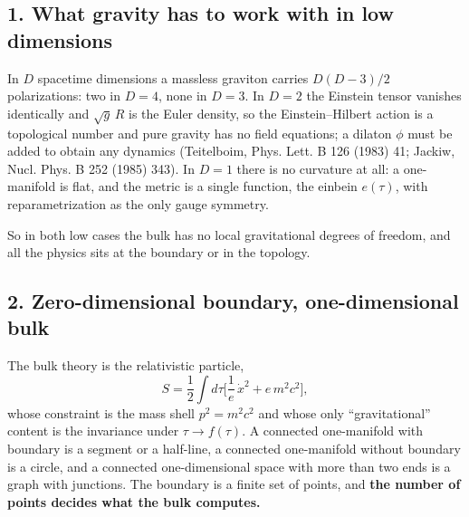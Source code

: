\documentclass[11pt,a4paper]{article}
\begin{document}
\hypertarget{what-gravity-has-to-work-with-in-low-dimensions}{%
\subsection{1. What gravity has to work with in low
dimensions}\label{what-gravity-has-to-work-with-in-low-dimensions}}

In \(D\) spacetime dimensions a massless graviton carries \(D(D-3)/2\)
polarizations: two in \(D=4\), none in \(D=3\). In \(D=2\) the Einstein
tensor vanishes identically and \(\sqrt g\,R\) is the Euler density, so
the Einstein--Hilbert action is a topological number and pure gravity
has no field equations; a dilaton \(\phi\) must be added to obtain any
dynamics (Teitelboim, Phys. Lett. B 126 (1983) 41; Jackiw, Nucl. Phys. B
252 (1985) 343). In \(D=1\) there is no curvature at all: a one-manifold
is flat, and the metric is a single function, the einbein \(e(\tau)\),
with reparametrization as the only gauge symmetry.

So in both low cases the bulk has no local gravitational degrees of
freedom, and all the physics sits at the boundary or in the topology.

\hypertarget{zero-dimensional-boundary-one-dimensional-bulk}{%
\subsection{2. Zero-dimensional boundary, one-dimensional
bulk}\label{zero-dimensional-boundary-one-dimensional-bulk}}

The bulk theory is the relativistic particle,
\[S=\frac12\int d\tau\Big[\frac{1}{e}\,\dot x^2+e\,m^2c^2\Big],\] whose
constraint is the mass shell \(p^2=m^2c^2\) and whose only
``gravitational'' content is the invariance under \(\tau\to f(\tau)\). A
connected one-manifold with boundary is a segment or a half-line, a
connected one-manifold without boundary is a circle, and a connected
one-dimensional space with more than two ends is a graph with junctions.
The boundary is a finite set of points, and \textbf{the number of points
decides what the bulk computes.}
\end{document}
